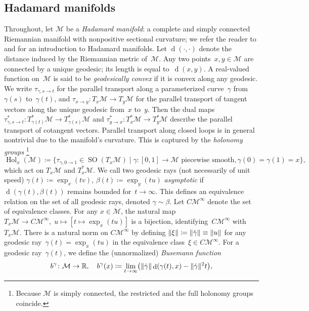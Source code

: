\documentclass[11pt,letterpaper]{article}
\numberwithin{equation}{section}
\newcommand{\RR}{\mathbb{R}}
\newcommand{\MM}{\mathcal{M}}
\DeclareMathOperator{\dist}{d}
\DeclareMathOperator{\SOr}{SO}
\DeclareMathOperator{\Hol}{Hol}
\DeclarePairedDelimiter\norm{\lVert}{\rVert}
\DeclarePairedDelimiter\parens{\lparen}{\rparen}
\begin{document}
\subsection{Hadamard manifolds}
Throughout, let $\MM$ be a \emph{Hadamard manifold}: a complete and simply connected Riemannian manifold with nonpositive sectional curvature;
we refer the reader to \cite[\S{}V.4]{Sakai1996} and \cite[II]{BridsonHaefliger1999} for an introduction to Hadamard manifolds.
Let $\dist(\cdot, \cdot)$ denote the distance induced by the Riemannian metric of~$\MM$.
Any two points~$x,y\in\MM$ are connected by a unique geodesic; its length is equal to~$\dist(x,y)$.
A real-valued function on~$\MM$ is said to be \emph{geodesically convex} if it is convex along any geodesic.
We write $\tau_{\gamma,s\to t}$ for the parallel transport along a parameterized curve~$\gamma$ from~$\gamma(s)$ to~$\gamma(t)$, and $\tau_{x\to y} \colon T_x\MM \to T_y\MM$ for the parallel transport of tangent vectors along the unique geodesic from~$x$ to~$y$.
Then the dual maps $\tau_{\gamma,s\to t}^* \colon T_{\gamma(t)}^*\MM \to T_{\gamma(s)}^*\MM$ and $\tau_{y \to x}^*\colon T_x^*\MM \to T_y^*\MM$ describe the parallel transport of cotangent vectors.
Parallel transport along closed loops is in general nontrivial due to the manifold's curvature.
This is captured by the \emph{holonomy groups}%
\footnote{Because $\MM$ is simply connected, the restricted and the full holonomy groups coincide.}
\[
    \Hol_x(\MM) \coloneqq \{\tau_{\gamma,0\to1} \in \SOr(T_x\MM)\mid \gamma\colon[0,1]\to\MM \text{ piecewise smooth}, \gamma(0) = \gamma(1) = x\},
\]
which act on $T_x\MM$ and $T^*_x\MM$.
We call two geodesic rays (not necessarily of unit speed) $\gamma(t)\coloneqq\exp_x(tv)$, $\beta(t)\coloneqq\exp_y(tu)$ \emph{asymptotic} if $\dist( \gamma(t) , \beta(t) )$ remains bounded for~$t\to\infty$.
This defines an equivalence relation on the set of all geodesic rays, denoted $\gamma\sim \beta$.
Let $C\MM^\infty$ denote the set of equivalence classes.
For any $x \in \MM$, the natural map $T_x\MM\rightarrow C\MM^{\infty},\; u \mapsto [t \mapsto \exp_x(tu)]$ is a bijection, identifying~$C\MM^\infty$ with~$T_x\MM$.
There is a natural norm on $C\MM^\infty$ by defining $\norm{\xi}\coloneqq \norm{\dot\gamma} \equiv \norm{u}$ for any geodesic ray~$\gamma(t) = \exp_x(tu)$ in the equivalence class~$\xi \in C\MM^\infty$.
For a geodesic ray~$\gamma(t)$, we define the (unnormalized) \emph{Busemann function}
\[
    b^\gamma \colon \MM \to \RR, \quad
    b^\gamma(x) \coloneqq \lim_{t\to\infty} \parens*{ \norm{\dot\gamma} \dist(\gamma(t), x) - \norm{\dot\gamma}^2 t },
\]
\end{document}
